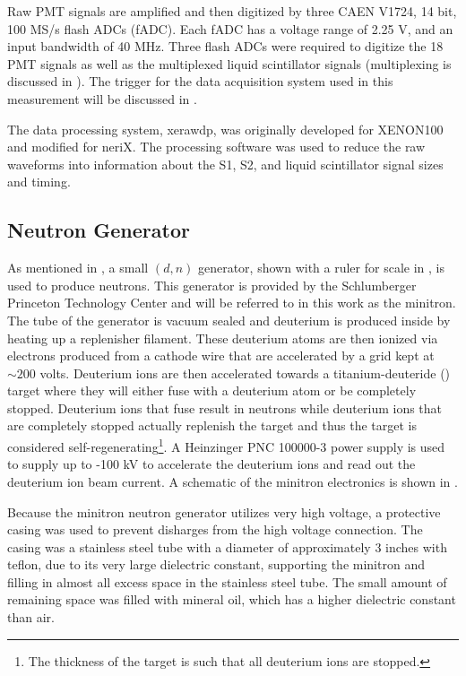 Raw PMT signals are amplified and then digitized by three CAEN V1724, 14 bit, 100 MS/s flash ADCs (fADC).  Each fADC has a voltage range of 2.25 V, and an input bandwidth of 40 MHz.   Three flash ADCs were required to digitize the 18 PMT signals as well as the multiplexed liquid scintillator signals (multiplexing is discussed in ).  The trigger for the data acquisition system used in this measurement will be discussed in .

The data processing system, xerawdp, was originally developed for XENON100 \cite{guillaume_thesis} and modified for neriX.  The processing software was used to reduce the raw waveforms into information about the S1, S2, and liquid scintillator signal sizes and timing.  




\subsection{Neutron Generator}

As mentioned in , a small $(d, n)$ generator, shown with a ruler for scale in ,  is used to produce neutrons.  This generator is provided by the Schlumberger Princeton Technology Center and will be referred to in this work as the minitron.  The tube of the generator is vacuum sealed and deuterium is produced inside by heating up a replenisher filament.  These deuterium atoms are then ionized via electrons produced from a cathode wire that are accelerated by a grid kept at $\sim 200$ volts.  Deuterium ions are then accelerated towards a titanium-deuteride () target where they will either fuse with a deuterium atom or be completely stopped.  Deuterium ions that fuse result in neutrons while deuterium ions that are completely stopped actually replenish the target and thus the target is considered self-regenerating\footnote{The thickness of the target is such that all deuterium ions are stopped.}.  A Heinzinger PNC 100000-3 power supply is used to supply up to -100 kV to accelerate the deuterium ions and read out the deuterium ion beam current.  A schematic of the minitron electronics is shown in .

Because the minitron neutron generator utilizes very high voltage, a protective casing was used to prevent disharges from the high voltage connection. The casing was a stainless steel tube with a diameter of approximately 3 inches with teflon, due to its very large dielectric constant, supporting the minitron and filling in almost all excess space in the stainless steel tube.  The small amount of remaining space was filled with mineral oil, which has a higher dielectric constant than air.

